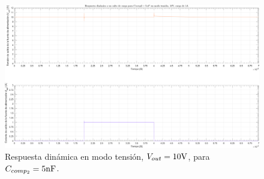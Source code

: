 \clearpage

\begin{figure}[H] %
\begin{center}
\includegraphics[width=1.1 \textwidth, angle=90]{./img/plots/dynamic/power_supply_CCOMP2_5n_STEP_Modo1.png}
\caption{\label{fig:fig_power_supply_CCOMP2_STEP_5n_Modo1}\footnotesize{Respuesta dinámica en modo tensión, $V_{out} = 10 \si[per-mode=symbol]{\volt}$, para $C_{comp_{2}} = 5 \si[per-mode=symbol]{\nano\farad} $.}}
\end{center}
\end{figure}

\clearpage
